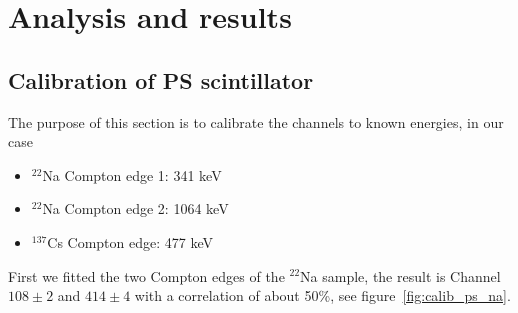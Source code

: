 \section{Analysis and results}
\label{sec:analysis}

\subsection{Calibration of PS scintillator}
\label{sub:calibration}
The purpose of this section is to calibrate the channels to known energies, in our case
\begin{itemize}
\item $^{22}$Na Compton edge 1: 341 keV
\item $^{22}$Na Compton edge 2: 1064 keV
\item $^{137}$Cs Compton edge: 477 keV
\end{itemize}
First we fitted the two Compton edges of the $^{22}$Na sample, the result is
Channel $108 \pm 2$ and $414 \pm 4$ with a correlation of about 50\%, see
figure~\ref{fig:calib_ps_na}.

